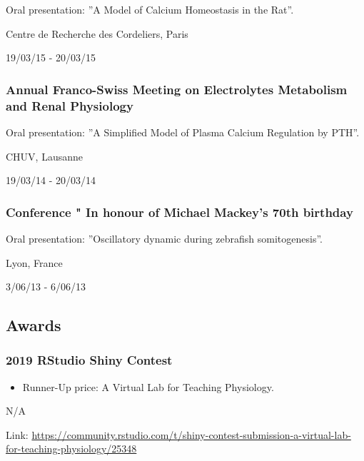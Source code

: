 \documentclass[
]{article}
\providecommand{\tightlist}{%
  \setlength{\itemsep}{0pt}\setlength{\parskip}{0pt}}
\begin{document}
Oral presentation: ''A Model of Calcium Homeostasis in the Rat''.

Centre de Recherche des Cordeliers, Paris

19/03/15 - 20/03/15

\hypertarget{annual-franco-swiss-meeting-on-electrolytes-metabolism-and-renal-physiology-2}{%
\subsubsection{Annual Franco-Swiss Meeting on Electrolytes Metabolism
and Renal
Physiology}\label{annual-franco-swiss-meeting-on-electrolytes-metabolism-and-renal-physiology-2}}

Oral presentation: ''A Simplified Model of Plasma Calcium Regulation by
PTH''.

CHUV, Lausanne

19/03/14 - 20/03/14

\hypertarget{conference-in-honour-of-michael-mackeys-70th-birthday}{%
\subsubsection{Conference " In honour of Michael Mackey's 70th
birthday}\label{conference-in-honour-of-michael-mackeys-70th-birthday}}

Oral presentation: ''Oscillatory dynamic during zebrafish
somitogenesis''.

Lyon, France

3/06/13 - 6/06/13

\hypertarget{awards}{%
\subsection{Awards}\label{awards}}

\hypertarget{rstudio-shiny-contest}{%
\subsubsection{2019 RStudio Shiny Contest}\label{rstudio-shiny-contest}}

\begin{itemize}
\tightlist
\item
  Runner-Up price: A Virtual Lab for Teaching Physiology.
\end{itemize}

N/A

Link:
\url{https://community.rstudio.com/t/shiny-contest-submission-a-virtual-lab-for-teaching-physiology/25348}
\end{document}
